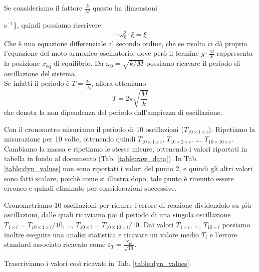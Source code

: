 \documentclass[italian, a4paper, 10pt, twocolumn]{../../style/lab_unige}
\newcommand{\reftab}[1]{Tab. {\ref{#1}}}%
\newcommand{\Ti}[1]{$T_{#1}$}
\begin{document}
    Se consideriamo il fattore $\frac{k}{M}$ questo ha dimensioni {s$^{-1}$\}, quindi possiamo riscrivere
    \[
        - \omega^2_0 \cdot \xi = \ddot{\xi}
    \]
    Che è una equazione differenziale al secondo ordine, che se risolta ci dà proprio l'equazione del moto 
    armonico oscillatorio, dove però il termine $g \cdot \frac{M}{k}$ rappresenta la posizione $x_{\text{eq}}$
    di equilibrio. Da $\omega_0 = \sqrt{k/M}$ possiamo ricavare il periodo di oscillazione del sistema.\\
    Se infatti il periodo è $T = \frac{2 \pi}{\omega_0}$, allora otteniamo
    \[
        T = 2 \pi \sqrt{\frac{M}{k}}
    \]
    che denota la non dipendenza del periodo dall'ampiezza di oscillazione. 

    Con il cronometro misuriamo il periodo di 10 oscillazioni (\Ti{10\times1\times i}). Ripetiamo la misurazione
    per 10 volte, ottenendo quindi \Ti{10\times1\times i}, \Ti{10\times2\times i}, \ldots , 
    \Ti{10\times10\times i}.\\
    Cambiamo la massa e ripetiamo le stesse misure, ottenendo i valori riportati in tabella in fondo al 
    documento (\reftab{table:raw_data}). In \reftab{table:dyn_values} non sono riportati i valori del punto 2, e 
    quindi gli altri valori sono fatti scalare, poichè come si illustra dopo, tale punto è ritenuto essere erroneo
    e quindi eliminato per considerazioni successive.%

    Cronometriamo 10 oscillazioni per ridurre l'errore di reazione dividendolo su più oscillazioni, dalle 
    quali ricaviamo poi il periodo di una singola oscillazione $T_{1\times i} = T_{10\times1\times i}/10$, \ldots ,
    $T_{10\times i} = T_{10\times10\times i}/10$.
    Dai valori $T_{1\times i}$, \ldots, $T_{10\times i}$ possiamo inoltre eseguire una analisi statistica e 
    ricavare un valore medio $\bar{T}_i$ e l'errore standard associato ricavato come 
    $\varepsilon_T = \frac{S_{10}}{\sqrt{10}}$. 
    
    Trascriviamo i valori così ricavati in \reftab{table:dyn_values}.

}
\end{document}

